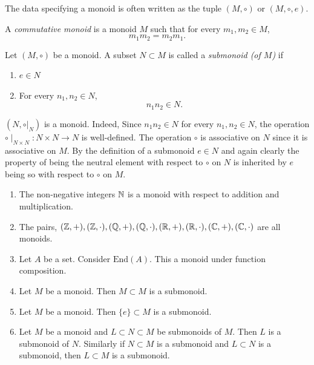 The data specifying a monoid is often written as the tuple $(M,\circ)$ or $(M,\circ,e)$.
\begin{definition}
    A \textit{commutative monoid} is a monoid $M$ such that for every $m_1,m_2\in M$,
    $$
        m_1m_2 = m_2m_1.
    $$
\end{definition}
\begin{definition}
    Let $(M,\circ)$ be a monoid. A subset $N\subset M$ is called a \textit{submonoid (of $M$)} if 
    \begin{enumerate}
        \item $e\in N$
        \item For every $n_1,n_2\in N$,
        $$
            n_1n_2\in N.
        $$
    \end{enumerate}
\end{definition}
\begin{remark}\label{ASubmonoidIsAMonoid}
     $(N,\circ|_N)$ is a monoid. Indeed, Since $n_1n_2\in N$ for every $n_1,n_2\in N$, the operation $\circ\mid_{N\times N} : N\times N\rightarrow N$ is well-defined. The operation $\circ$ is associative on $N$ since it is associative on $M$. By the definition of a submonoid $e\in N$ and again clearly the property of being the neutral element with respect to $\circ$ on $N$ is inherited by $e$ being so with respect to $\circ$ on $M$.  
\end{remark}
\begin{example}\label{SubMonoidsExample}
    \begin{enumerate}
        \item The non-negative integers $\mathbb{N}$ is a monoid with respect to addition and multiplication. 
        \item The pairs, $(\mathbb{Z},+),(\mathbb{Z},\cdot),(\mathbb{Q},+),(\mathbb{Q},\cdot),(\mathbb{R},+),(\mathbb{R},\cdot),(\mathbb{C},+),(\mathbb{C},\cdot)$ are all monoids.
        \item Let $A$ be a set. Consider $\mathrm{End}(A)$. This a monoid under function composition.
        \item Let $M$ be a monoid. Then $M\subset M$ is a submonoid. 
        \item Let $M$ be a monoid. Then $\{e\}\subset M$ is a submonoid.
        \item Let $M$ be a monoid and $L\subset N\subset M$ be submonoids of $M$. Then $L$ is a submonoid of $N$. Similarly if $N\subset M$ is a submonoid and $L\subset N$ is a submonoid, then $L\subset M$ is a submonoid. 
    \end{enumerate}
\end{example}
